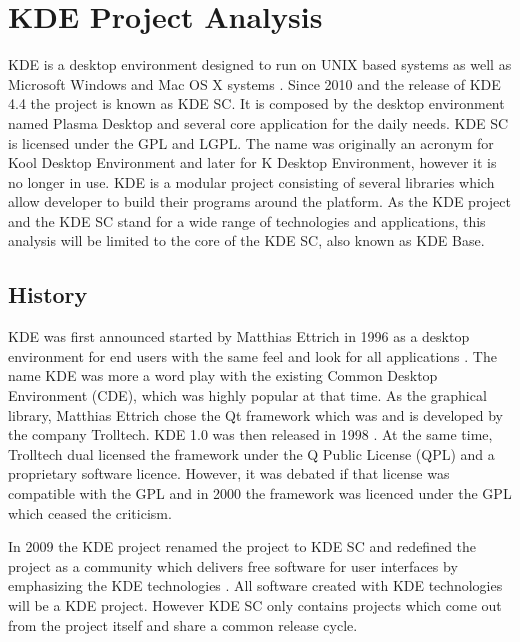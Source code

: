 \section{KDE Project Analysis} %


KDE is a desktop environment designed to run on UNIX based systems as well as
Microsoft Windows and Mac OS X systems \cite{KDEPress,KDEAbout}. Since 2010 and
the release of KDE 4.4 the project is known as \ac{KDE SC}. It is composed by
the desktop environment named Plasma Desktop and several core application for
the daily needs. \ac{KDE SC} is licensed under the \ac{GPL} and \ac{LGPL}. The
name was originally an acronym for Kool Desktop Environment and later for K
Desktop Environment, however it is no longer in use. KDE is a modular project
consisting of several libraries which allow developer to build their programs
around the platform. As the KDE project and the \ac{KDE SC} stand for a wide
range of technologies and applications, this analysis will be limited to the
core of the \ac{KDE SC}, also known as KDE Base.

\subsection{History} %

KDE was first announced started by Matthias Ettrich in 1996 as a desktop
environment for end users with the same feel and look for all applications
\cite{KDEAnnouncement}. The name KDE was more a word play with the existing
Common Desktop Environment (CDE), which was highly popular at that time. As the
graphical library, Matthias Ettrich chose the Qt framework which was and is
developed by the company Trolltech. KDE 1.0 was then released in 1998
\cite{KDEHistory}. At the same time, Trolltech dual licensed the framework
under the Q Public License (QPL) and a proprietary software licence. However,
it was debated if that license was compatible with the \ac{GPL} and in 2000 the
framework was licenced under the \ac{GPL} which ceased the criticism.

In 2009 the KDE project renamed the project to \ac{KDE SC} and redefined the
project as a community which delivers free software for user interfaces by
emphasizing the KDE technologies \cite{KDESC}. All software created with KDE
technologies will be a KDE project. However \ac{KDE SC} only contains projects
which come out from the project itself and share a common release cycle.

